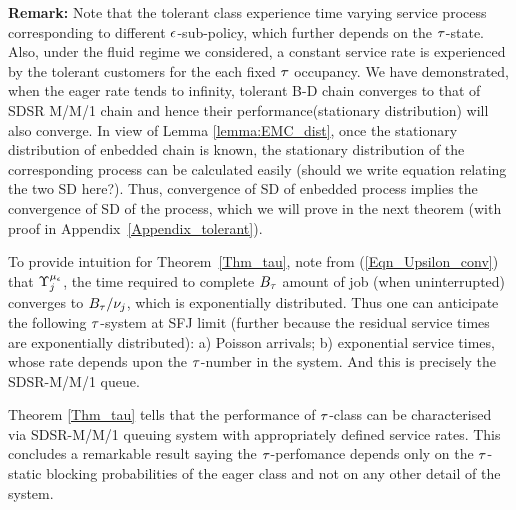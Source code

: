 {	%
	\noindent
	{\bf Remark:} Note that the tolerant class experience time
        varying service process corresponding to different
        ${ \epsilon }$-sub-policy, which further depends on the
        ${\tau}$-state. Also, under the fluid regime we considered, a
        constant service rate is experienced by the tolerant customers
        for the each fixed ${\tau}$ occupancy. We have demonstrated, when
        the eager rate tends to infinity, tolerant B-D chain converges
        to that of SDSR M/M/1 chain and hence their
        performance(stationary distribution) will also converge. In
        view of Lemma \ref{lemma:EMC_dist}, once the stationary
        distribution of enbedded chain is known, the stationary
        distribution of the corresponding process can be calculated
        easily (should we write equation relating the two SD
        here?). Thus, convergence of SD of enbedded process implies
        the convergence of SD of the process, which we will prove in
        the next theorem (with proof in
        Appendix~\ref{Appendix_tolerant}).


To provide intuition for Theorem~\ref{Thm_tau}, note from
(\ref{Eqn_Upsilon_conv}) that $\Upsilon_j^{{\mu_\epsilon}}$, the time required
to complete $B_{\tau}$ amount of job (when uninterrupted) converges to
$B_{\tau} / \nu_j$, which is exponentially distributed.  Thus one can
anticipate the following ${\tau}$-system at SFJ limit (further because the
residual service times are exponentially distributed): a) Poisson
arrivals; b) exponential service times, whose rate depends upon the
${\tau}$-number in the system. And this is precisely the SDSR-M/M/1 queue.
%

Theorem \ref{Thm_tau} tells that the performance of ${\tau}$-class can be characterised via SDSR-M/M/1 queuing system with appropriately defined service rates. This concludes a remarkable result saying  the ${\tau}$-perfomance depends  
only on the ${\tau}$-static blocking probabilities of the eager class and not on any other detail of the system.
} %



